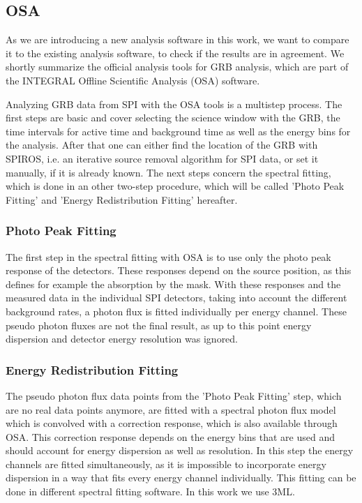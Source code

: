 \documentclass[twocolumn]{aa}
\begin{document}
\subsection{OSA}
\label{OSA}

As we are introducing a new analysis software in this work, we want to compare it to the existing analysis software, to check if the results are in agreement. We shortly summarize the official analysis tools for GRB analysis, which are part of the INTEGRAL Offline Scientific Analysis (OSA) software. \citep{osa}

Analyzing GRB data from SPI with the OSA tools is a multistep process. The first steps are basic and cover selecting the science window with the GRB, the time intervals for active time and background time as well as the energy bins for the analysis. After that one can either find the location of the GRB with SPIROS, i.e. an iterative source removal algorithm for SPI data, or set it manually, if it is already known. The next steps concern the spectral fitting, which is done in an other two-step procedure, which will be called 'Photo Peak Fitting' and 'Energy Redistribution Fitting' hereafter.

\subsubsection*{Photo Peak Fitting}

The first step in the spectral fitting with OSA is to use only the photo peak response of the detectors. These responses depend on the source position, as this defines for example the absorption by the mask. With these responses and the measured data in the individual SPI detectors, taking into account the different background rates, a photon flux is fitted individually per energy channel. These pseudo photon fluxes are not the final result, as up to this point energy dispersion and detector energy resolution was ignored.

\subsubsection*{Energy Redistribution Fitting}

The pseudo photon flux data points from the 'Photo Peak Fitting' step, which are no real data points anymore, are fitted with a spectral photon flux model which is convolved with a correction response, which is also available through OSA. This correction response depends on the energy bins that are used and should account for energy dispersion as well as resolution. In this step the energy channels are fitted simultaneously, as it is impossible to incorporate energy dispersion in a way that fits every energy channel individually. This fitting can be done in different spectral fitting software. In this work we use 3ML.
\end{document}

